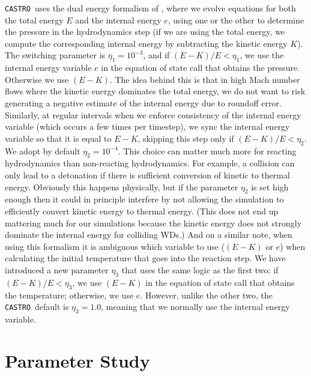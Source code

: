 \documentclass[twocolumn,numberedappendix]{../aastex6}
\newcommand{\castro}{\texttt{CASTRO}}
\begin{document}
\castro\ uses the dual energy formalism of \cite{bryan:1995,ENZO}, where we evolve equations
for both the total energy $E$ and the internal energy $e$, using one or the other to
determine the pressure in the hydrodynamics step (if we are using the total energy, we
compute the corresponding internal energy by subtracting the kinetic energy $K$). The switching
parameter is $\eta_1 = 10^{-3}$, and if $(E - K) / E < \eta_1$, we use the internal energy variable $e$
in the equation of state call that obtains the pressure. Otherwise we use $(E - K)$. The
idea behind this is that in high Mach number flows where the kinetic energy dominates the
total energy, we do not want to risk generating a negative estimate of the internal energy
due to roundoff error. Similarly, at regular intervals when we enforce consistency of the
internal energy variable (which occurs a few times per timestep), we sync the internal energy
variable so that it is equal to $E - K$, skipping this step only if $(E - K) / E < \eta_2$.
We adopt by default $\eta_2 = 10^{-4}$. This choice can matter much more for reacting
hydrodynamics than non-reacting hydrodynamics. For example, a collision can only lead to a
detonation if there is sufficient conversion of kinetic to thermal energy. Obviously
this happens physically, but if the parameter $\eta_2$ is set high enough then it could
in principle interfere by not allowing the simulation to efficiently convert kinetic energy
to thermal energy. (This does not end up mattering much for our simulations because the
kinetic energy does not strongly dominate the internal energy for colliding WDs.) And on
a similar note, when using this formalism it is ambiguous which variable to use ($(E - K)$
or $e$) when calculating the initial temperature that goes into the reaction step. We
have introduced a new parameter $\eta_3$ that uses the same logic as the first two: if
$(E - K) / E < \eta_3$, we use $(E - K)$ in the equation of state call that obtains the
temperature; otherwise, we use $e$. However, unlike the other two, the \castro\ default
is $\eta_3 = 1.0$, meaning that we normally use the internal energy variable.



\section{Parameter Study}
\label{sec:parameters}
\end{document}
